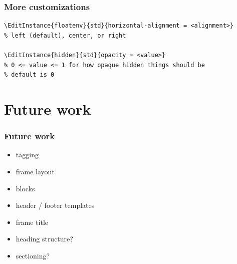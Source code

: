\documentclass{ltx-talk}
\begin{document}
\begin{frame*}
\frametitle{More customizations}
\begin{lstlisting}
\EditInstance{floatenv}{std}{horizontal-alignment = <alignment>}
% left (default), center, or right

\EditInstance{hidden}{std}{opacity = <value>}
% 0 <= value <= 1 for how opaque hidden things should be
% default is 0
\end{lstlisting}
\end{frame*}

\section{Future work}

\begin{frame}
\frametitle{Future work}
\begin{itemize}
\item tagging
\item frame layout
\item blocks
\item header / footer templates
\item frame title
\item heading structure?
\item sectioning?
\end{itemize}
\end{frame}
\end{document}
